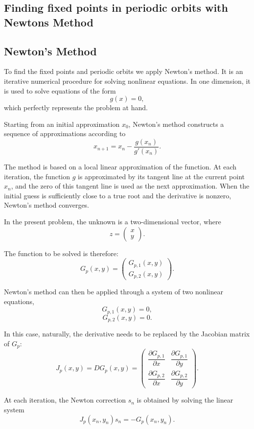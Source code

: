 \subsection{Finding fixed points in periodic orbits with Newtons Method}
\subsection*{Newton's Method}

To find the fixed points and periodic orbits we apply Newton's method. It is an iterative numerical procedure for solving nonlinear equations. In one dimension, it is used to solve equations of the form
\[
g(x)=0,
\]
which perfectly represents the problem at hand.


Starting from an initial approximation \(x_0\), Newton's method constructs a sequence of approximations according to
\[
x_{n+1}=x_n-\frac{g(x_n)}{g'(x_n)}.
\]

The method is based on a local linear approximation of the function. At each iteration, the function \(g\) is approximated by its tangent line at the current point \(x_n\), and the zero of this tangent line is used as the next approximation. When the initial guess is sufficiently close to a true root and the derivative is nonzero, Newton's method converges.

In the present problem, the unknown is a two-dimensional vector, where
\[
z=
\begin{pmatrix}
x \\
y
\end{pmatrix}.
\]

The function to be solved is therefore:
\[
G_p(x,y)=
\begin{pmatrix}
G_{p,1}(x,y) \\
G_{p,2}(x,y)
\end{pmatrix}.
\]

Newton's method can then be applied through a system of two nonlinear equations,
\[
G_{p,1}(x,y)=0,
\]
\[
G_{p,2}(x,y)=0.
\]

In this case, naturally,  the derivative needs to be replaced by the Jacobian matrix of \(G_p\):
\[
J_p(x,y)=DG_p(x,y)
=
\begin{pmatrix}
\dfrac{\partial G_{p,1}}{\partial x} &
\dfrac{\partial G_{p,1}}{\partial y} \\
\dfrac{\partial G_{p,2}}{\partial x} &
\dfrac{\partial G_{p,2}}{\partial y}
\end{pmatrix}.
\]

At each iteration, the Newton correction \(s_n\) is obtained by solving the linear system
\[
J_p(x_n,y_n)s_n=-G_p(x_n,y_n).
\]

